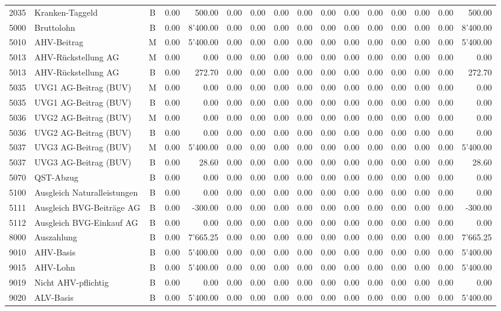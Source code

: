 \documentclass[8pt,a4paper]{extarticle}
\begin{document}
\begin{longtable}{@{\extracolsep{\fill}} l l c r r r r r r r r r r r r r}
2035&Kranken-Taggeld&B&0.00&500.00&0.00&0.00&0.00&0.00&0.00&0.00&0.00&0.00&0.00&0.00&500.00\\
5000&Bruttolohn&B&0.00&8'400.00&0.00&0.00&0.00&0.00&0.00&0.00&0.00&0.00&0.00&0.00&8'400.00\\
5010&AHV-Beitrag&M&0.00&5'400.00&0.00&0.00&0.00&0.00&0.00&0.00&0.00&0.00&0.00&0.00&5'400.00\\
5013&AHV-Rückstellung AG&M&0.00&0.00&0.00&0.00&0.00&0.00&0.00&0.00&0.00&0.00&0.00&0.00&0.00\\
5013&AHV-Rückstellung AG&B&0.00&272.70&0.00&0.00&0.00&0.00&0.00&0.00&0.00&0.00&0.00&0.00&272.70\\
5035&UVG1 AG-Beitrag (BUV)&M&0.00&0.00&0.00&0.00&0.00&0.00&0.00&0.00&0.00&0.00&0.00&0.00&0.00\\
5035&UVG1 AG-Beitrag (BUV)&B&0.00&0.00&0.00&0.00&0.00&0.00&0.00&0.00&0.00&0.00&0.00&0.00&0.00\\
5036&UVG2 AG-Beitrag (BUV)&M&0.00&0.00&0.00&0.00&0.00&0.00&0.00&0.00&0.00&0.00&0.00&0.00&0.00\\
5036&UVG2 AG-Beitrag (BUV)&B&0.00&0.00&0.00&0.00&0.00&0.00&0.00&0.00&0.00&0.00&0.00&0.00&0.00\\
5037&UVG3 AG-Beitrag (BUV)&M&0.00&5'400.00&0.00&0.00&0.00&0.00&0.00&0.00&0.00&0.00&0.00&0.00&5'400.00\\
5037&UVG3 AG-Beitrag (BUV)&B&0.00&28.60&0.00&0.00&0.00&0.00&0.00&0.00&0.00&0.00&0.00&0.00&28.60\\
5070&QST-Abzug&B&0.00&0.00&0.00&0.00&0.00&0.00&0.00&0.00&0.00&0.00&0.00&0.00&0.00\\
5100&Ausgleich Naturalleistungen&B&0.00&0.00&0.00&0.00&0.00&0.00&0.00&0.00&0.00&0.00&0.00&0.00&0.00\\
5111&Ausgleich BVG-Beiträge AG&B&0.00&-300.00&0.00&0.00&0.00&0.00&0.00&0.00&0.00&0.00&0.00&0.00&-300.00\\
5112&Ausgleich BVG-Einkauf AG&B&0.00&0.00&0.00&0.00&0.00&0.00&0.00&0.00&0.00&0.00&0.00&0.00&0.00\\
8000&Auszahlung&B&0.00&7'665.25&0.00&0.00&0.00&0.00&0.00&0.00&0.00&0.00&0.00&0.00&7'665.25\\
9010&AHV-Basis&B&0.00&5'400.00&0.00&0.00&0.00&0.00&0.00&0.00&0.00&0.00&0.00&0.00&5'400.00\\
9015&AHV-Lohn&B&0.00&5'400.00&0.00&0.00&0.00&0.00&0.00&0.00&0.00&0.00&0.00&0.00&5'400.00\\
9019&Nicht AHV-pflichtig&B&0.00&0.00&0.00&0.00&0.00&0.00&0.00&0.00&0.00&0.00&0.00&0.00&0.00\\
9020&ALV-Basis&B&0.00&5'400.00&0.00&0.00&0.00&0.00&0.00&0.00&0.00&0.00&0.00&0.00&5'400.00\\

\end{longtable}
\end{document}
